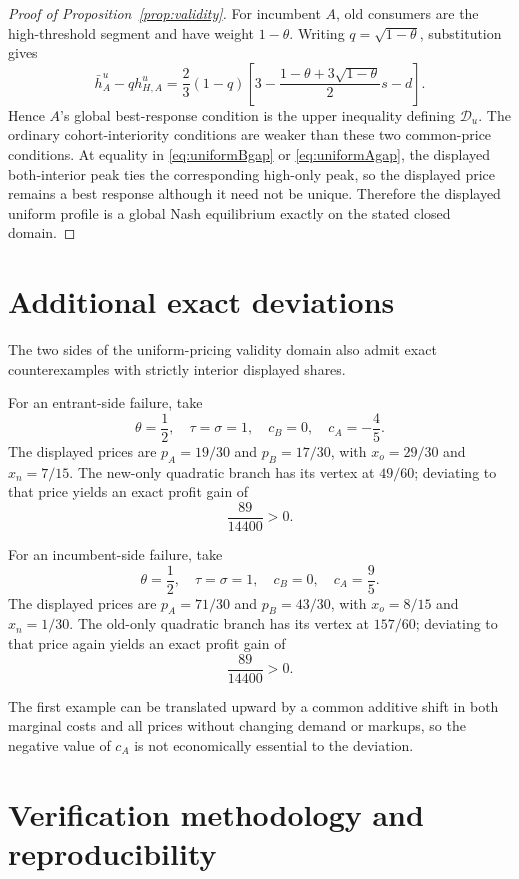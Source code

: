 \documentclass[11pt]{article}
\begin{document}
\begin{proof}[Proof of Proposition~\ref{prop:validity}]
For incumbent $A$, old consumers are the high-threshold segment and have weight
$1-\theta$.  Writing $q=\sqrt{1-\theta}$, substitution gives
\begin{equation}
 \bar h_A^u-qh_{H,A}^u
 =
 \frac{2}{3}(1-q)
 \left[
 3-\frac{1-\theta+3\sqrt{1-\theta}}{2}s-d
 \right].
 \label{eq:uniformAgap}
\end{equation}
Hence $A$'s global best-response condition is the upper inequality defining
$\mathcal D_u$.  The ordinary cohort-interiority conditions are weaker than
these two common-price conditions.  At equality in
\eqref{eq:uniformBgap} or \eqref{eq:uniformAgap}, the displayed
both-interior peak ties the corresponding high-only peak, so the displayed
price remains a best response although it need not be unique.  Therefore the
displayed uniform profile is a global Nash equilibrium exactly on the stated
closed domain.
\end{proof}

\section{Additional exact deviations}

The two sides of the uniform-pricing validity domain also admit exact
counterexamples with strictly interior displayed shares.

For an entrant-side failure, take
\[
 \theta=\frac12,\quad \tau=\sigma=1,\quad c_B=0,\quad c_A=-\frac45.
\]
The displayed prices are $p_A=19/30$ and $p_B=17/30$, with
$x_o=29/30$ and $x_n=7/15$.  The new-only quadratic branch has its vertex at
$49/60$; deviating to that price yields an exact profit gain of
\[
 \frac{89}{14400}>0.
\]

For an incumbent-side failure, take
\[
 \theta=\frac12,\quad \tau=\sigma=1,\quad c_B=0,\quad c_A=\frac95.
\]
The displayed prices are $p_A=71/30$ and $p_B=43/30$, with
$x_o=8/15$ and $x_n=1/30$.  The old-only quadratic branch has its vertex at
$157/60$; deviating to that price again yields an exact profit gain of
\[
 \frac{89}{14400}>0.
\]

The first example can be translated upward by a common additive shift in both
marginal costs and all prices without changing demand or markups, so the
negative value of $c_A$ is not economically essential to the deviation.

\section{Verification methodology and reproducibility}
\end{document}
